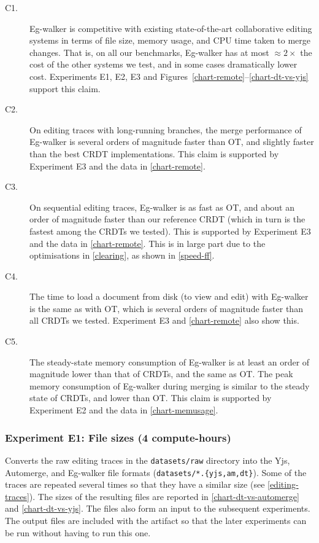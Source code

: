 \documentclass[sigplan,10pt]{acmart}
\begin{document}
\begin{description}
    \item[C1.] Eg-walker is competitive with existing state-of-the-art collaborative editing systems in terms of file size, memory usage, and CPU time taken to merge changes.
    That is, on all our benchmarks, Eg-walker has at most $\approx 2\times$ the cost of the other systems we test, and in some cases dramatically lower cost.
    Experiments E1, E2, E3 and Figures~\ref{chart-remote}--\ref{chart-dt-vs-yjs} support this claim.
    \item[C2.] On editing traces with long-running branches, the merge performance of Eg-walker is several orders of magnitude faster than OT, and slightly faster than the best CRDT implementations.
    This claim is supported by Experiment E3 and the data in \autoref{chart-remote}.
    \item[C3.] On sequential editing traces, Eg-walker is as fast as OT, and about an order of magnitude faster than our reference CRDT (which in turn is the fastest among the CRDTs we tested).
    This is supported by Experiment E3 and the data in \autoref{chart-remote}.
    This is in large part due to the optimisations in \autoref{clearing}, as shown in \autoref{speed-ff}.
    \item[C4.] The time to load a document from disk (to view and edit) with Eg-walker is the same as with OT, which is several orders of magnitude faster than all CRDTs we tested.
    Experiment E3 and \autoref{chart-remote} also show this.
    \item[C5.] The steady-state memory consumption of Eg-walker is at least an order of magnitude lower than that of CRDTs, and the same as OT.
    The peak memory consumption of Eg-walker during merging is similar to the steady state of CRDTs, and lower than OT.
    This claim is supported by Experiment E2 and the data in \autoref{chart-memusage}.
\end{description}

\subsubsection{Experiment E1: File sizes (4 compute-hours)}

Converts the raw editing traces in the \verb|datasets/raw| directory into the Yjs, Automerge, and Eg-walker file formats (\verb|datasets/*.{yjs,am,dt}|).
Some of the traces are repeated several times so that they have a similar size (see \autoref{editing-traces}).
The sizes of the resulting files are reported in \autoref{chart-dt-vs-automerge} and \autoref{chart-dt-vs-yjs}.
The files also form an input to the subsequent experiments.
The output files are included with the artifact so that the later experiments can be run without having to run this one.
\end{document}

